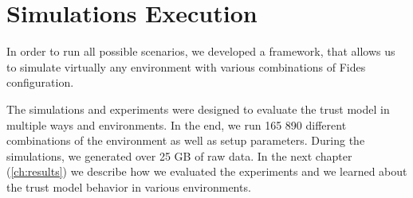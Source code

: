 \section{Simulations Execution}
\label{sec:simulations-execution}
In order to run all possible scenarios, we developed a framework, that allows us to simulate virtually any environment with various combinations of Fides configuration.



The simulations and experiments were designed to evaluate the trust model in multiple ways and environments.
In the end, we run 165 890 different combinations of the environment as well as setup parameters.
During the simulations, we generated over 25 GB of raw data.
In the next chapter (\ref{ch:results}) we describe how we evaluated the experiments and we learned about the trust model behavior in various environments.